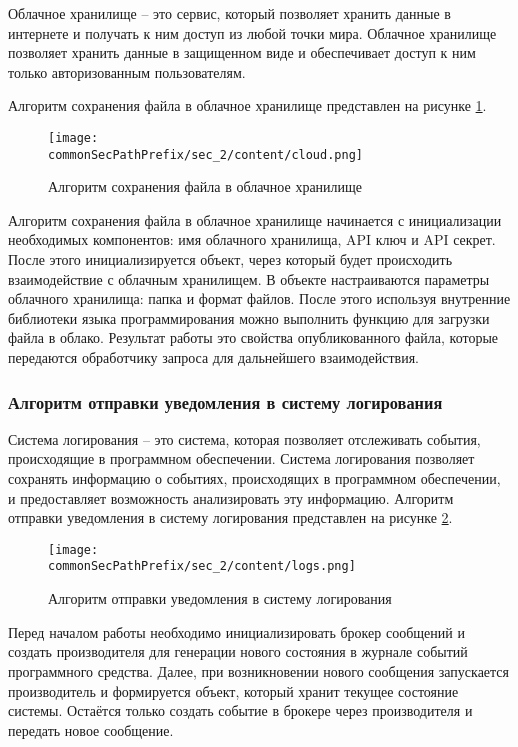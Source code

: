 Облачное хранилище -- это сервис, который позволяет хранить данные в интернете и получать к ним доступ из любой точки мира.
Облачное хранилище позволяет хранить данные в защищенном виде и обеспечивает доступ к ним только авторизованным пользователям.

Алгоритм сохранения файла в облачное хранилище представлен на рисунке \ref{fig:save_file}.

\begin{figure}[ht]
    \centering
    \texttt{[image: \\commonSecPathPrefix/sec\_2/content/cloud.png]}
    \caption{Алгоритм сохранения файла в облачное хранилище}
    \label{fig:save_file}
\end{figure}

Алгоритм сохранения файла в облачное хранилище начинается с инициализации необходимых компонентов: имя облачного хранилища,
API ключ и API секрет. После этого инициализируется объект, через который будет происходить взаимодействие с облачным хранилищем.
В объекте настраиваются параметры облачного хранилища: папка и формат файлов. После этого используя внутренние библиотеки языка
программирования можно выполнить функцию для загрузки файла в облако. Результат работы это свойства опубликованного файла, которые
передаются обработчику запроса для дальнейшего взаимодействия.

\subsubsection{Алгоритм отправки уведомления в систему логирования}

Система логирования -- это система, которая позволяет отслеживать события, происходящие в программном обеспечении.
Система логирования позволяет сохранять информацию о событиях, происходящих в программном обеспечении, и предоставляет возможность
анализировать эту информацию.
Алгоритм отправки уведомления в систему логирования представлен на рисунке \ref{fig:log}.

\begin{figure}[ht]
    \centering
    \texttt{[image: \\commonSecPathPrefix/sec\_2/content/logs.png]}
    \caption{Алгоритм отправки уведомления в систему логирования}
    \label{fig:log}
\end{figure}

Перед началом работы необходимо инициализировать брокер сообщений и создать производителя для генерации нового состояния в журнале
событий программного средства. Далее, при возникновении нового сообщения запускается производитель и формируется объект, который хранит
текущее состояние системы. Остаётся только создать событие в брокере через производителя и передать новое сообщение.